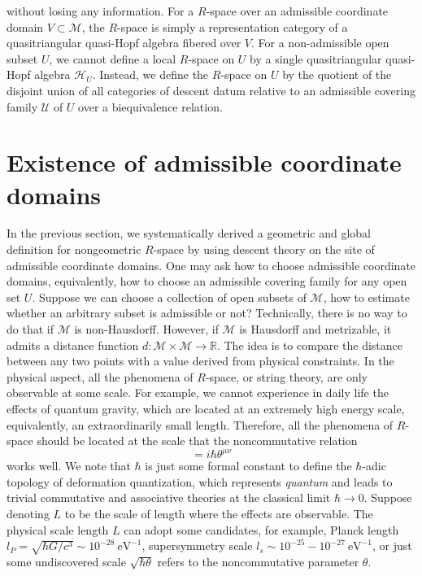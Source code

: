 \documentclass[reqno]{amsart}
\theoremstyle{definition}
\theoremstyle{remark}
\begin{document}
without losing any information. For a $R$-space over an admissible coordinate domain $V\subset\mathcal{M}$, the $R$-space is simply a representation category of a quasitriangular quasi-Hopf algebra fibered over $V$. For a non-admissible open subset $U$, we cannot define a local $R$-space on $U$ by a single quasitriangular quasi-Hopf algebra $\mathscr{H}_U$. Instead, we define the $R$-space on $U$ by the quotient of the disjoint union of all categories of descent datum relative to an admissible covering family $\mathcal{U}$ of $U$ over a biequivalence relation. 

\section{Existence of admissible coordinate domains}\label{sec:Admissible coordinate domains}
In the previous section, we systematically derived a geometric and global definition for nongeometric $R$-space by using descent theory on the site of admissible coordinate domains. One may ask how to choose admissible coordinate domains, equivalently, how to choose an admissible covering family for any open set $U$. Suppose we can choose a collection of open subsets of $\mathcal{M}$, how to estimate whether an arbitrary subset is admissible or not? Technically, there is no way to do that if $\mathcal{M}$ is non-Hausdorff. However, if $\mathcal{M}$ is Hausdorff and metrizable, it admits a distance function $d:\mathcal{M}\times \mathcal{M} \longrightarrow \mathbb{R}$. The idea is to compare the distance between any two points with a value derived from physical constraints. In the physical aspect, all the phenomena of $R$-space, or string theory, are only observable at some scale. For example, we cannot experience in daily life the effects of quantum gravity, which are located at an extremely high energy scale, equivalently, an extraordinarily small length. Therefore, all the phenomena of $R$-space should be located at the scale that the noncommutative relation
\begin{equation}
    [x^\mu,x^\nu] = i\hbar \theta^{\mu\nu}
\end{equation}
works well. We note that $\hbar$ is just some formal constant to define the $\hbar$-adic topology of deformation quantization, which represents \textit{quantum} and leads to trivial commutative and associative theories at the classical limit $\hbar \to 0$. Suppose denoting $L$ to be the scale of length where the effects are observable. The physical scale length $L$ can adopt some candidates, for example, Planck length $l_P = \sqrt{\hbar G/c^3} \sim 10^{-28}\ \text{eV}^{-1}$, supersymmetry scale $l_s \sim10^{-25} - 10^{-27}\ \text{eV}^{-1}$, or just some undiscovered scale $\sqrt{\hbar \theta}$ refers to the noncommutative parameter $\theta$. 
\end{document}
